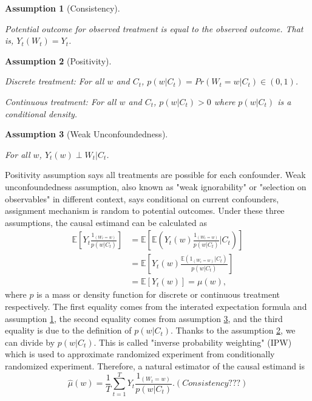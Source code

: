 \documentclass[12pt]{article}
\newtheorem{asm}{Assumption}
\begin{document}
\begin{asm}[Consistency]\label{asm:consistency}\hfill

	Potential outcome for observed treatment is equal to the observed outcome.
	That is, $Y_t(W_t) = Y_t$.
\end{asm}

\begin{asm}[Positivity]\label{asm:positivity}\hfill

	Discrete treatment:
	For all $w$ and $C_t$, $p(w\lvert C_t) = Pr\left ( W_t = w \lvert C_t\right ) \in (0, 1)$.

	Continuous treatment:
	For all $w$ and $C_t$, $p(w\lvert C_t) > 0$ where $p(w\lvert C_t)$ is a conditional density.
\end{asm}


\begin{asm}[Weak Unconfoundedness]\label{asm:unconfoundedness} \hfill

	For all $w$, $Y_{t}(w) \perp W_t \lvert C_t$.
\end{asm}


Positivity assumption says all treatments are possible for each confounder.
Weak unconfoundedness assumption, 
also known as "weak ignorability" or "selection on observables" in different context, says
conditional on current confounders, assignment mechanism is random to potential outcomes.
Under these three assumptions, the causal estimand can be calculated as
\[
	\begin{split}
		\mathbb{E}\left[ Y_t\frac{1_{(W_t = w)}}{p(w\lvert C_t)} \right]
		& = \mathbb{E}\left[ \mathbb{E}\left( Y_t(w) \frac{1_{(W_t = w)}}{p(w\lvert C_t)} \lvert C_t\right)\right]\\
		& = \mathbb{E}\left[ Y_t(w)\frac{\mathbb{E}\left( 1_{(W_t = w)}\lvert C_t \right)}{p(w\lvert C_t)} \right]\\
		& = \mathbb{E}\left[ Y_t(w) \right] = \mu(w),
	\end{split}
\]
where $p$ is a mass or density function for discrete or continuous treatment respectively.
The first equality comes from the interated expectation formula and assumption \ref{asm:consistency},
the second equality comes from assumption \ref{asm:unconfoundedness},
and the third equality is due to the definition of $p(w\lvert C_t)$.
Thanks to the assumption \ref{asm:positivity}, we can divide by $p(w\lvert C_t)$.
This is called "inverse probability weighting" (IPW)
which is used to approximate randomized experiment from conditionally randomized experiment.
Therefore, a natural estimator of the causal estimand is
\[
	\hat{\mu}(w) = \frac{1}{T}\sum_{t = 1}^T Y_t \frac{1_{(W_t = w)}}{p(w\lvert C_t)}.	
	(Consistency???)
\]
\end{document}
